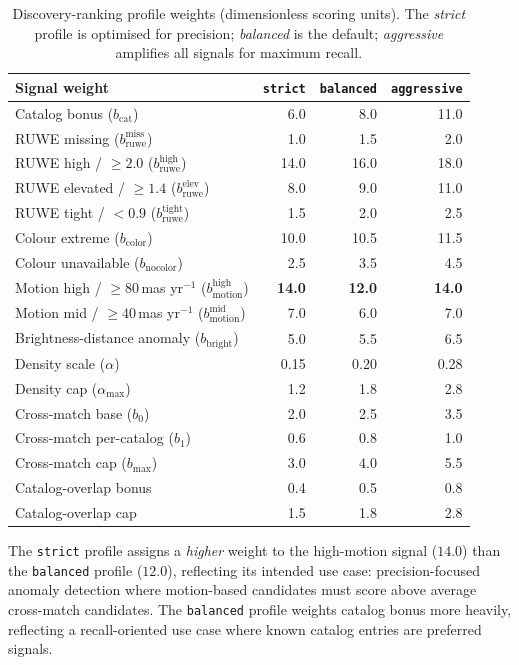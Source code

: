 \documentclass[12pt]{elsarticle}
\begin{document}
\begin{table}[htbp]
\centering
\caption{Discovery-ranking profile weights (dimensionless scoring units). The \textit{strict} profile is optimised for precision; \textit{balanced} is the default; \textit{aggressive} amplifies all signals for maximum recall.}
\label{tab:profiles}
\begin{tabular}{lrrr}
\toprule
\textbf{Signal weight} & \texttt{strict} & \texttt{balanced} & \texttt{aggressive} \\
\midrule
Catalog bonus ($b_{\mathrm{cat}}$) & 6.0 & 8.0 & 11.0 \\
RUWE missing ($b_{\mathrm{ruwe}}^{\mathrm{miss}}$) & 1.0 & 1.5 & 2.0 \\
RUWE high / $\ge 2.0$ ($b_{\mathrm{ruwe}}^{\mathrm{high}}$) & 14.0 & 16.0 & 18.0 \\
RUWE elevated / $\ge 1.4$ ($b_{\mathrm{ruwe}}^{\mathrm{elev}}$) & 8.0 & 9.0 & 11.0 \\
RUWE tight / $<0.9$ ($b_{\mathrm{ruwe}}^{\mathrm{tight}}$) & 1.5 & 2.0 & 2.5 \\
Colour extreme ($b_{\mathrm{color}}$) & 10.0 & 10.5 & 11.5 \\
Colour unavailable ($b_{\mathrm{nocolor}}$) & 2.5 & 3.5 & 4.5 \\
Motion high / $\ge 80\,$mas yr$^{-1}$ ($b_{\mathrm{motion}}^{\mathrm{high}}$) & \textbf{14.0} & \textbf{12.0} & \textbf{14.0} \\
Motion mid / $\ge 40\,$mas yr$^{-1}$ ($b_{\mathrm{motion}}^{\mathrm{mid}}$) & 7.0 & 6.0 & 7.0 \\
Brightness-distance anomaly ($b_{\mathrm{bright}}$) & 5.0 & 5.5 & 6.5 \\
Density scale ($\alpha$) & 0.15 & 0.20 & 0.28 \\
Density cap ($\alpha_{\max}$) & 1.2 & 1.8 & 2.8 \\
Cross-match base ($b_0$) & 2.0 & 2.5 & 3.5 \\
Cross-match per-catalog ($b_1$) & 0.6 & 0.8 & 1.0 \\
Cross-match cap ($b_{\max}$) & 3.0 & 4.0 & 5.5 \\
Catalog-overlap bonus & 0.4 & 0.5 & 0.8 \\
Catalog-overlap cap & 1.5 & 1.8 & 2.8 \\
\bottomrule
\end{tabular}
\end{table}

The \texttt{strict} profile assigns a \emph{higher} weight to the high-motion signal ($14.0$) than the \texttt{balanced} profile ($12.0$), reflecting its intended use case: precision-focused anomaly detection where motion-based candidates must score above average cross-match candidates. The \texttt{balanced} profile weights catalog bonus more heavily, reflecting a recall-oriented use case where known catalog entries are preferred signals.
\end{document}
